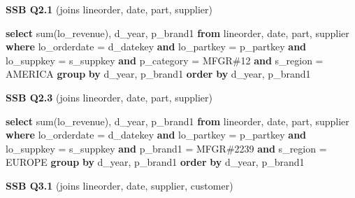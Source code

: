 \documentclass[
  10pt,
]{article}
\newenvironment{Shaded}{}{}
\newcommand{\DataTypeTok}[1]{\textcolor[rgb]{0.56,0.13,0.00}{#1}}
\newcommand{\FunctionTok}[1]{\textcolor[rgb]{0.02,0.16,0.49}{#1}}
\newcommand{\KeywordTok}[1]{\textcolor[rgb]{0.00,0.44,0.13}{\textbf{#1}}}
\newcommand{\NormalTok}[1]{#1}
\newcommand{\OperatorTok}[1]{\textcolor[rgb]{0.40,0.40,0.40}{#1}}
\newcommand{\StringTok}[1]{\textcolor[rgb]{0.25,0.44,0.63}{#1}}
\begin{document}
\textbf{SSB Q2.1} (joins lineorder, date, part, supplier)

\begin{Shaded}
\begin{Highlighting}[]
\KeywordTok{select} \FunctionTok{sum}\NormalTok{(lo\_revenue), d\_year, p\_brand1}
\KeywordTok{from}\NormalTok{ lineorder, }\DataTypeTok{date}\NormalTok{, part, supplier}
\KeywordTok{where}\NormalTok{ lo\_orderdate }\OperatorTok{=}\NormalTok{ d\_datekey }\KeywordTok{and}\NormalTok{ lo\_partkey }\OperatorTok{=}\NormalTok{ p\_partkey }\KeywordTok{and}\NormalTok{ lo\_suppkey }\OperatorTok{=}\NormalTok{ s\_suppkey }\KeywordTok{and}\NormalTok{ p\_category }\OperatorTok{=} \StringTok{\textquotesingle{}MFGR\#12\textquotesingle{}} \KeywordTok{and}\NormalTok{ s\_region }\OperatorTok{=} \StringTok{\textquotesingle{}AMERICA\textquotesingle{}}
\KeywordTok{group} \KeywordTok{by}\NormalTok{ d\_year, p\_brand1}
\KeywordTok{order} \KeywordTok{by}\NormalTok{ d\_year, p\_brand1}
\end{Highlighting}
\end{Shaded}

\textbf{SSB Q2.3} (joins lineorder, date, part, supplier)

\begin{Shaded}
\begin{Highlighting}[]
\KeywordTok{select} \FunctionTok{sum}\NormalTok{(lo\_revenue), d\_year, p\_brand1}
\KeywordTok{from}\NormalTok{ lineorder, }\DataTypeTok{date}\NormalTok{, part, supplier}
\KeywordTok{where}\NormalTok{ lo\_orderdate }\OperatorTok{=}\NormalTok{ d\_datekey }\KeywordTok{and}\NormalTok{ lo\_partkey }\OperatorTok{=}\NormalTok{ p\_partkey }\KeywordTok{and}\NormalTok{ lo\_suppkey }\OperatorTok{=}\NormalTok{ s\_suppkey }\KeywordTok{and}\NormalTok{ p\_brand1 }\OperatorTok{=} \StringTok{\textquotesingle{}MFGR\#2239\textquotesingle{}} \KeywordTok{and}\NormalTok{ s\_region }\OperatorTok{=} \StringTok{\textquotesingle{}EUROPE\textquotesingle{}}
\KeywordTok{group} \KeywordTok{by}\NormalTok{ d\_year, p\_brand1}
\KeywordTok{order} \KeywordTok{by}\NormalTok{ d\_year, p\_brand1}
\end{Highlighting}
\end{Shaded}

\textbf{SSB Q3.1} (joins lineorder, date, supplier, customer)
\end{document}

